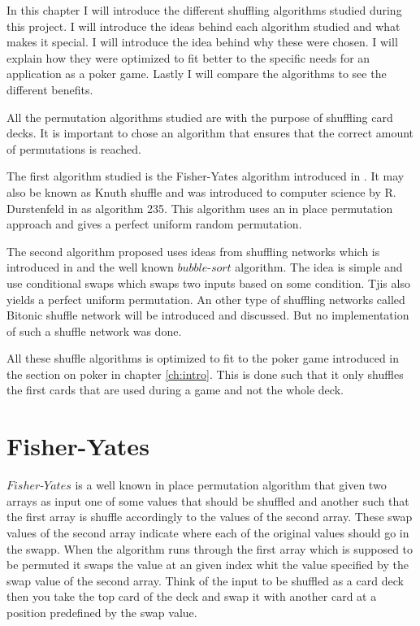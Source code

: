 In this chapter I will introduce the different shuffling algorithms studied during this project. I will introduce the ideas behind each algorithm studied and what makes it special. I will introduce the idea behind why these were chosen. I will explain how they were optimized to fit better to the specific needs for an application as a poker game. Lastly I will compare the algorithms to see the different benefits. 

All the permutation algorithms studied are with the purpose of shuffling card decks. It is important to chose an algorithm that ensures that the correct amount of permutations is reached.

The first algorithm studied is the Fisher-Yates algorithm introduced in . It may also be known as Knuth shuffle and was introduced to computer science by R. Durstenfeld in  as algorithm 235. This algorithm uses an in place permutation approach and gives a perfect uniform random permutation.

The second algorithm proposed uses ideas from shuffling networks which is introduced in  and the well known $bubble\text{-}sort$ algorithm. The idea is simple and use conditional swaps which swaps two inputs based on some condition. Tjis also yields a perfect uniform permutation.
An other type of shuffling networks called Bitonic shuffle network will be introduced and discussed. But no implementation of such a shuffle network was done.

All these shuffle algorithms is optimized to fit to the poker game introduced in the section on poker in chapter \ref{ch:intro}. This is done such that it only shuffles the first cards that are used during a game and not the whole deck.

\section{Fisher-Yates}

$Fisher\text{-}Yates$ is a well known in place permutation algorithm that given two arrays as input one of some values that should be shuffled and another such that the first array is shuffle accordingly to the values of the second array. These swap values of the second array indicate where each of the original values should go in the swapp. When the algorithm runs through the first array which is supposed to be permuted it swaps the value at an given index whit the value specified by the swap value of the second array. Think of the input to be shuffled as a card deck then you take the top card of the deck and swap it with another card at a position predefined by the swap value.

